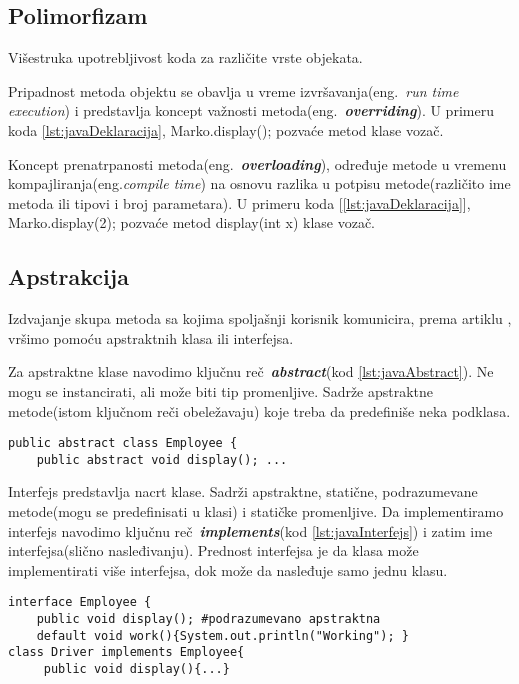 \documentclass[a4paper]{article}
\begin{document}
\subsection{Polimorfizam}
\label{subsec:javaPolimorfizam}

Višestruka upotrebljivost koda za različite vrste objekata.

Pripadnost metoda objektu  se obavlja u vreme izvršavanja(eng.~{\em run time execution}) i predstavlja koncept važnosti metoda(eng.~{\em\textbf{overriding}})\cite{horstmann2017core}. U primeru koda \ref{lst:javaDeklaracija}, Marko.display(); pozvaće metod klase vozač. 

Koncept prenatrpanosti metoda(eng.~{\em\textbf{overloading}})\cite{horstmann2017core}, određuje metode u vremenu kompajliranja(eng.{\em compile time}) na osnovu razlika u potpisu metode(različito ime metoda ili tipovi i broj parametara). U primeru koda [\ref{lst:javaDeklaracija}], Marko.display(2); pozvaće metod display(int x) klase vozač.

\subsection{Apstrakcija}
\label{subsec:javaApstrakcija}

Izdvajanje skupa metoda sa kojima spoljašnji korisnik komunicira, prema artiklu \cite{oopJava}, vršimo pomoću apstraktnih klasa ili interfejsa.

Za apstraktne klase navodimo ključnu reč~{\em \textbf{abstract}}(kod \ref{lst:javaAbstract}). Ne mogu se instancirati, ali može biti tip promenljive. Sadrže apstraktne metode(istom ključnom reči obeležavaju) koje treba da predefiniše neka podklasa.

\begin{lstlisting}[caption={Apstraktna klasa},frame=single, label=lst:javaAbstract]
public abstract class Employee {
	public abstract void display(); ...
\end{lstlisting}

Interfejs predstavlja nacrt klase. Sadrži apstraktne, statične, podrazumevane metode(mogu se predefinisati u klasi) i statičke promenljive. Da implementiramo interfejs navodimo ključnu reč~{\em \textbf{implements}}(kod \ref{lst:javaInterfejs}) i zatim ime interfejsa(slično nasleđivanju). Prednost interfejsa\cite{horstmann2017core} je da klasa može implementirati više interfejsa, dok može da nasleđuje samo jednu klasu.

\begin{lstlisting}[caption={Interfejs},frame=single, label=lst:javaInterfejs]
interface Employee {
	public void display(); #podrazumevano apstraktna
	default void work(){System.out.println("Working"); }
class Driver implements Employee{  
   	 public void display(){...}
\end{lstlisting}
\end{document}
